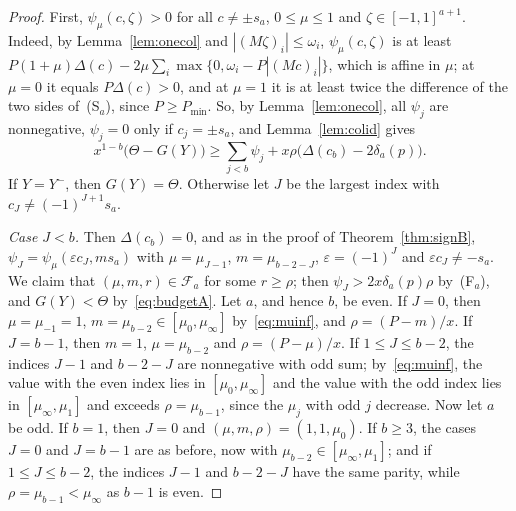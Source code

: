 \documentclass[11pt]{article}
\theoremstyle{remark}
\begin{document}
\begin{proof}
First, $\psi_\mu(c,\zeta)>0$ for all $c\ne\pm s_a$, $0\le\mu\le1$ and
$\zeta\in[-1,1]^{a+1}$. Indeed, by Lemma~\ref{lem:onecol} and
$|(M\zeta)_i|\le\omega_i$, $\psi_\mu(c,\zeta)$ is at least
$P(1+\mu)\Delta(c)-2\mu\sum_i\max\{0,\omega_i-P|(Mc)_i|\}$, which is affine in
$\mu$; at $\mu=0$ it equals $P\Delta(c)>0$, and at $\mu=1$ it is at least twice
the difference of the two sides of~(S$_a$), since $P\ge P_{\min}$. So, by
Lemma~\ref{lem:onecol}, all $\psi_j$ are nonnegative, $\psi_j=0$ only if
$c_j=\pm s_a$, and Lemma~\ref{lem:colid} gives
\begin{equation}\label{eq:budgetA}
x^{1-b}\bigl(\Theta-G(Y)\bigr)\ge\sum_{j<b}\psi_j
+x\rho\bigl(\Delta(c_b)-2\delta_a(p)\bigr).
\end{equation}
If $Y=Y^-$, then $G(Y)=\Theta$. Otherwise let $J$ be the largest index with
$c_J\ne(-1)^{J+1}s_a$.

\emph{Case $J<b$.} Then $\Delta(c_b)=0$, and as in the proof of
Theorem~\ref{thm:signB}, $\psi_J=\psi_\mu(\varepsilon c_J,ms_a)$ with
$\mu=\mu_{J-1}$, $m=\mu_{b-2-J}$, $\varepsilon=(-1)^J$ and
$\varepsilon c_J\ne-s_a$. We claim that $(\mu,m,r)\in\mathcal F_a$ for some
$r\ge\rho$; then $\psi_J>2x\delta_a(p)\rho$ by~(F$_a$), and $G(Y)<\Theta$
by~\eqref{eq:budgetA}. Let $a$, and hence $b$, be even. If $J=0$, then
$\mu=\mu_{-1}=1$, $m=\mu_{b-2}\in[\mu_0,\mu_\infty]$ by~\eqref{eq:muinf},
and $\rho=(P-m)/x$. If $J=b-1$, then $m=1$, $\mu=\mu_{b-2}$ and
$\rho=(P-\mu)/x$. If $1\le J\le b-2$, the indices $J-1$ and $b-2-J$ are
nonnegative with odd sum; by~\eqref{eq:muinf}, the value with the even index
lies in $[\mu_0,\mu_\infty]$ and the value with the odd index lies in
$[\mu_\infty,\mu_1]$ and exceeds $\rho=\mu_{b-1}$, since the $\mu_j$ with odd
$j$ decrease. Now let $a$ be odd. If $b=1$, then $J=0$ and
$(\mu,m,\rho)=(1,1,\mu_0)$. If $b\ge3$, the cases $J=0$ and $J=b-1$ are as
before, now with $\mu_{b-2}\in[\mu_\infty,\mu_1]$; and if $1\le J\le b-2$,
the indices $J-1$ and $b-2-J$ have the same parity, while
$\rho=\mu_{b-1}<\mu_\infty$ as $b-1$ is even.


\end{proof}
\end{document}

